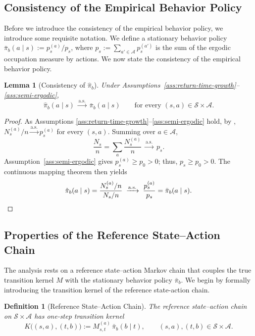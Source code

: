 \documentclass{article}
\numberwithin{equation}{section}
\newtheorem{definition}{Definition}
\newtheorem{lemma}{Lemma}
\begin{document}
\subsection{Consistency of the Empirical Behavior Policy}
\label{app:lem:policy-consistency}
Before we introduce the consistency of the empirical behavior policy, we introduce some requisite notation.
We define a stationary behavior policy $\bar\pi_b(a\mid s) := p_s^{(a)}/p_s$, where $p_s := \sum_{a'\in\mathcal{A}} p_s^{(a')}$ is the sum of the ergodic occupation measure by actions.
We now state the consistency of the empirical behavior policy.
\begin{lemma}[Consistency of $\hat \pi_b$] 
\label{lem:policy-consistency}
Under Assumptions~\ref{ass:return-time-growth}--\ref{ass:semi-ergodic},
\[
\hat\pi_b(a\mid s) \;\xrightarrow{\mathrm{a.s.}}\; \bar\pi_b(a\mid s)
\qquad \text{for every }(s,a)\in\mathcal{S}\times\mathcal{A}.
\]
\end{lemma}
\begin{proof}
As Assumptions \ref{ass:return-time-growth}--\ref{ass:semi-ergodic} hold, by \citet[Lemma~2]{su2025centrallimittheoremstransition}, $N_s^{(a)}/n \xrightarrow{\mathrm{a.s.}} p_s^{(a)}$ for every $(s,a)$. Summing over $a \in \mathcal A$,
\[
\frac{N_s}{n} = \sum_{a} \frac{N_s^{(a)}}{n} \;\xrightarrow{\mathrm{a.s.}}\; p_s.
\]
Assumption~\ref{ass:semi-ergodic} gives $p_s^{(a)} \ge p_0 > 0$; thus, $p_s \ge p_0 > 0$. The continuous mapping theorem then yields
\[
\hat\pi_b(a\mid s)
= \frac{N_s^{(a)}/n}{N_s/n}
\;\xrightarrow{\mathrm{a.s.}}\;
\frac{p_s^{(a)}}{p_s}
= \bar\pi_b(a\mid s). \qedhere
\]
\end{proof}

\subsection{Properties of the Reference State--Action Chain}
\label{app:lem:ref-chain}

The analysis rests on a reference state--action Markov chain that couples the true transition kernel $M$ with the stationary behavior policy $\bar\pi_b$.
We begin by formally introducing the transition kernel of the reference state-action chain.
\begin{definition}[Reference State--Action Chain]
\label{def:ref-chain}
The reference state--action chain on $\mathcal{S}\times\mathcal{A}$ has one-step transition kernel
\[
K\bigl((s,a),(t,b)\bigr) := M_{s,t}^{(a)}\,\bar\pi_b(b\mid t), \qquad (s,a),(t,b)\in\mathcal{S}\times\mathcal{A}.
\]
\end{definition}
\end{document}
